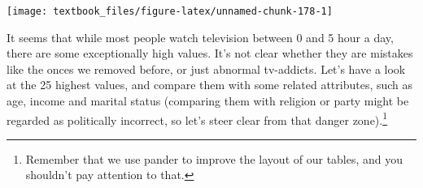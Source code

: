 \documentclass[]{tufte-book}
\newenvironment{Shaded}{}{}
\newcommand{\DecValTok}[1]{\textcolor[rgb]{0.25,0.63,0.44}{#1}}
\newcommand{\KeywordTok}[1]{\textcolor[rgb]{0.00,0.44,0.13}{\textbf{#1}}}
\newcommand{\NormalTok}[1]{#1}
\newcommand{\OperatorTok}[1]{\textcolor[rgb]{0.40,0.40,0.40}{#1}}
\newcommand{\StringTok}[1]{\textcolor[rgb]{0.25,0.44,0.63}{#1}}
\begin{document}
\texttt{[image: textbook\_files/figure-latex/unnamed-chunk-178-1]}

It seems that while most people watch television between 0 and 5 hour a day, there are some exceptionally high values. It's not clear whether they are mistakes like the onces we removed before, or just abnormal tv-addicts. Let's have a look at the 25 highest values, and compare them with some related attributes, such as age, income and marital status (comparing them with religion or party might be regarded as politically incorrect, so let's steer clear from that danger zone).\footnote{Remember that we use pander to improve the layout of our tables, and you shouldn't pay attention to that.}

\begin{Shaded}
\end{Shaded}
\end{document}
